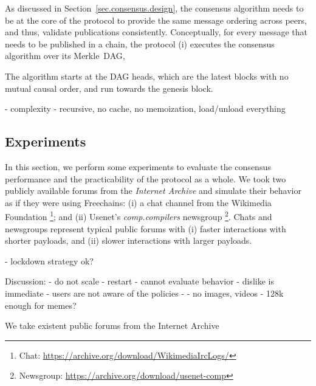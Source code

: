 \documentclass[10pt,journal,compsoc]{IEEEtran}
\newcommand{\FC}       {Freechains\xspace}
\begin{document}
As discussed in Section~\ref{sec.consensus.design}, the consensus algorithm
needs to be at the core of the protocol to provide the same message ordering
across peers, and thus, validate publications consistently.
Conceptually, for every message that needs to be published in a chain, the
protocol
    (i) executes the consensus algorithm over its Merkle~DAG,

The algorithm starts at the DAG heads, which are the latest blocks with no
mutual causal order, and run towards the genesis block.

- complexity
- recursive, no cache, no memoization, load/unload everything


\subsection{Experiments}
\label{sec.consensus.eval}

In this section, we perform some experiments to evaluate the consensus
performance and the practicability of the protocol as a whole.
We took two publicly available forums from the \emph{Internet Archive} and
simulate their behavior as if they were using \FC:
%
    (i)  a chat channel from the Wikimedia Foundation%
\footnote{ Chat: \url{https://archive.org/download/WikimediaIrcLogs/} }; and
    (ii) Usenet's \emph{comp.compilers} newsgroup%
\footnote{ Newsgroup: \url{https://archive.org/download/usenet-comp} }.
%
Chats and newsgroups represent typical public forums with
    (i)  faster interactions with shorter payloads, and
    (ii) slower interactions with larger payloads.

- lockdown strategy ok?

Discussion:
- do not scale
    - restart
- cannot evaluate behavior
    - dislike is immediate
- users are not aware of the policies
    -
- no images, videos
    - 128k enough for memes?

We take existent public forums from the Internet Archive

\end{document}
